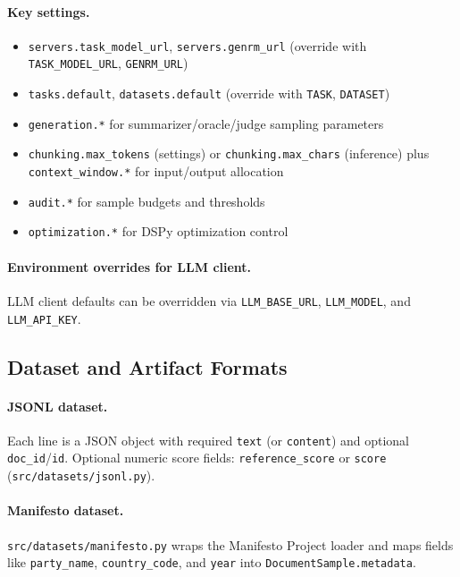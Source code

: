 \paragraph{Key settings.}
\begin{itemize}[nosep]
    \item \texttt{servers.task\_model\_url}, \texttt{servers.genrm\_url} (override with \texttt{TASK\_MODEL\_URL}, \texttt{GENRM\_URL})
    \item \texttt{tasks.default}, \texttt{datasets.default} (override with \texttt{TASK}, \texttt{DATASET})
    \item \texttt{generation.*} for summarizer/oracle/judge sampling parameters
    \item \texttt{chunking.max\_tokens} (settings) or \texttt{chunking.max\_chars} (inference) plus \texttt{context\_window.*} for input/output allocation
    \item \texttt{audit.*} for sample budgets and thresholds
    \item \texttt{optimization.*} for DSPy optimization control
\end{itemize}

\paragraph{Environment overrides for LLM client.}
LLM client defaults can be overridden via \texttt{LLM\_BASE\_URL},
\texttt{LLM\_MODEL}, and \texttt{LLM\_API\_KEY}.

\subsection{Dataset and Artifact Formats}

\paragraph{JSONL dataset.}
Each line is a JSON object with required \texttt{text} (or \texttt{content})
and optional \texttt{doc\_id}/\texttt{id}. Optional numeric score fields:
\texttt{reference\_score} or \texttt{score} (\texttt{src/datasets/jsonl.py}).

\paragraph{Manifesto dataset.}
\texttt{src/datasets/manifesto.py} wraps the Manifesto Project loader and
maps fields like \texttt{party\_name}, \texttt{country\_code}, and \texttt{year}
into \texttt{DocumentSample.metadata}.

